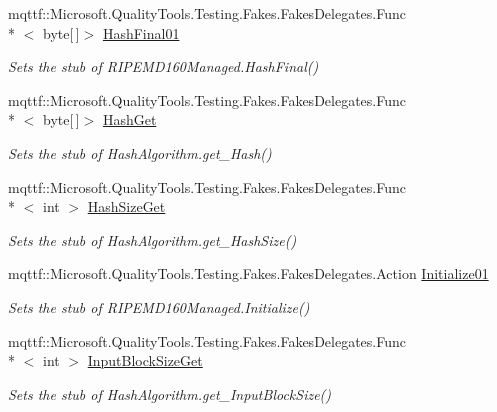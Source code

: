 \begin{DoxyCompactItemize}
mqttf\-::\-Microsoft.\-Quality\-Tools.\-Testing.\-Fakes.\-Fakes\-Delegates.\-Func\\*
$<$ byte\mbox{[}$\,$\mbox{]}$>$ \hyperlink{class_system_1_1_security_1_1_cryptography_1_1_fakes_1_1_stub_r_i_p_e_m_d160_managed_a578377ac439fb5f6f5143821670fc152}{Hash\-Final01}
\begin{DoxyCompactList}\small\item\em Sets the stub of R\-I\-P\-E\-M\-D160\-Managed.\-Hash\-Final()\end{DoxyCompactList}\item 
mqttf\-::\-Microsoft.\-Quality\-Tools.\-Testing.\-Fakes.\-Fakes\-Delegates.\-Func\\*
$<$ byte\mbox{[}$\,$\mbox{]}$>$ \hyperlink{class_system_1_1_security_1_1_cryptography_1_1_fakes_1_1_stub_r_i_p_e_m_d160_managed_a4c4cf10ede97f0a0d59ccde0b7a7984f}{Hash\-Get}
\begin{DoxyCompactList}\small\item\em Sets the stub of Hash\-Algorithm.\-get\-\_\-\-Hash()\end{DoxyCompactList}\item 
mqttf\-::\-Microsoft.\-Quality\-Tools.\-Testing.\-Fakes.\-Fakes\-Delegates.\-Func\\*
$<$ int $>$ \hyperlink{class_system_1_1_security_1_1_cryptography_1_1_fakes_1_1_stub_r_i_p_e_m_d160_managed_a37d4d1ae5232488d9355cd7354f3b572}{Hash\-Size\-Get}
\begin{DoxyCompactList}\small\item\em Sets the stub of Hash\-Algorithm.\-get\-\_\-\-Hash\-Size()\end{DoxyCompactList}\item 
mqttf\-::\-Microsoft.\-Quality\-Tools.\-Testing.\-Fakes.\-Fakes\-Delegates.\-Action \hyperlink{class_system_1_1_security_1_1_cryptography_1_1_fakes_1_1_stub_r_i_p_e_m_d160_managed_af70be2bcf6396790d1dbc55bd8aef823}{Initialize01}
\begin{DoxyCompactList}\small\item\em Sets the stub of R\-I\-P\-E\-M\-D160\-Managed.\-Initialize()\end{DoxyCompactList}\item 
mqttf\-::\-Microsoft.\-Quality\-Tools.\-Testing.\-Fakes.\-Fakes\-Delegates.\-Func\\*
$<$ int $>$ \hyperlink{class_system_1_1_security_1_1_cryptography_1_1_fakes_1_1_stub_r_i_p_e_m_d160_managed_a8520652aa4d9f9c4bd852be9086dcb92}{Input\-Block\-Size\-Get}
\begin{DoxyCompactList}\small\item\em Sets the stub of Hash\-Algorithm.\-get\-\_\-\-Input\-Block\-Size()\end{DoxyCompactList}\item 

\end{DoxyCompactItemize}

